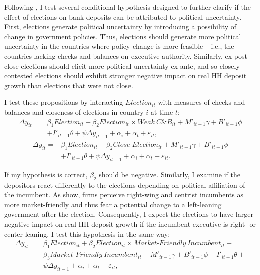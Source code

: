 \documentclass[12pt,a4paper]{article}
\begin{document}
Following \citet{li2018national}, I test several conditional hypothesis designed to further clarify if the effect of elections on bank deposits can be attributed to political uncertainty. First, elections generate political uncertainty by introducing a possibility of change in government policies. Thus, elections should generate more political uncertainty in the countries where policy change is more feasible -- i.e., the countries lacking checks and balances on executive authority. Similarly, ex post close elections should elicit more political uncertainty ex ante, and so closely contested elections should exhibit stronger negative impact on real HH deposit growth than elections that were not close.

I test these propositions by interacting $Election_{it}$ with measures of checks and balances and closeness of elections in country $i$ at time $t$:
\begin{equation}\label{model2}
\begin{split}
\Delta y_{it} = &\beta_1 Election_{it} + \beta_2 Election_{it} \times Weak\ C\&B_{it} + M'_{it-1}\gamma + B'_{it-1}\phi \\
&+ I'_{it-1} \theta +\psi \Delta y_{it-1} + \alpha_i + \alpha_t + \varepsilon_{it},
\end{split}
\end{equation}
\begin{equation}\label{model3}
\begin{split}
\Delta y_{it} = &\beta_1 Election_{it} + \beta_2 Close\ Election_{it} + M'_{it-1}\gamma + B'_{it-1}\phi \\
&+ I'_{it-1} \theta +\psi \Delta y_{it-1} + \alpha_i + \alpha_t + \varepsilon_{it}.
\end{split}
\end{equation}

If my hypothesis is correct, $\beta_2$ should be negative. Similarly, I examine if the depositors react differently to the elections depending on political affiliation of the incumbent. As \citet{julio2012political} show, firms perceive right-wing and centrist incumbents as more market-friendly and thus fear a potential change to a left-leaning government after the election. Consequently, I expect the elections to have larger negative impact on real HH deposit growth if the incumbent executive is right- or center-leaning. I test this hypothesis in the same way:
\begin{equation}\label{model4}
\begin{split}
\Delta y_{it} = &\beta_1 Election_{it} + \beta_2 Election_{it} \times Market\text{-}Friendly\ Incumbent_{it} + \\
&\beta_3 Market\text{-}Friendly\ Incumbent_{it} + M'_{it-1}\gamma + B'_{it-1}\phi + I'_{it-1} \theta + \\
&\psi \Delta y_{it-1} + \alpha_i + \alpha_t + \varepsilon_{it},
\end{split}
\end{equation}
\end{document}
